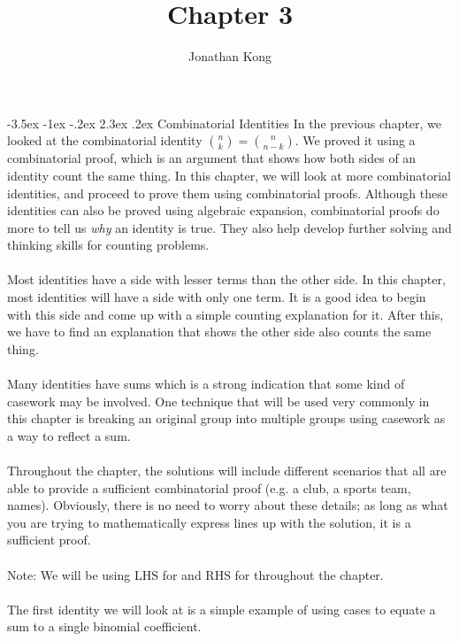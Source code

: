 \documentclass[11pt]{scrartcl}
\title{\normalfont\notesize\textbf{Chapter 3}}
\author{Jonathan Kong}
\date{}
\makeatletter
\renewcommand\section{\@startsection{section}{1}{\z@}%
                                   {-3.5ex \@plus -1ex \@minus -.2ex}%
                                   {2.3ex \@plus.2ex}%
                                   {\normalfont\large\bfseries}}
\makeatother
\begin{document}
\maketitle
\section{Combinatorial Identities}
In the previous chapter, we looked at the combinatorial identity ${{n \choose k}}={{{n} \choose {n-k}}}$. We proved it using a combinatorial proof, which is an argument that shows how both sides of an identity count the same thing. In this chapter, we will look at more combinatorial identities, and proceed to prove them using combinatorial proofs. Although these identities can also be proved using algebraic expansion, combinatorial proofs do more to tell us \textit{why} an identity is true. They also help develop further solving and thinking skills for counting problems.  \\
\\
\noindent
Most identities have a side with lesser terms than the other side. In this chapter, most identities will have a side with only one term. It is a good idea to begin with this side and come up with a simple counting explanation for it. After this, we have to find an explanation that shows the other side also counts the same thing. \\
\\
\noindent 
Many identities have sums which is a strong indication that some kind of casework may be involved. One technique that will be used very commonly in this chapter is breaking an original group into multiple groups using casework as a way to reflect a sum. \\
\\
\noindent
Throughout the chapter, the solutions will include different scenarios that all are able to provide a sufficient combinatorial proof (e.g. a club, a sports team, names). Obviously, there is no need to worry about these details; as long as what you are trying to mathematically express lines up with the solution, it is a sufficient proof. \\
\\
\noindent
Note: We will be using LHS for  and RHS for  throughout the chapter. \\
\\
\noindent 
The first identity we will look at is a simple example of using cases to equate a sum to a single binomial coefficient.
\\
\end{document}
